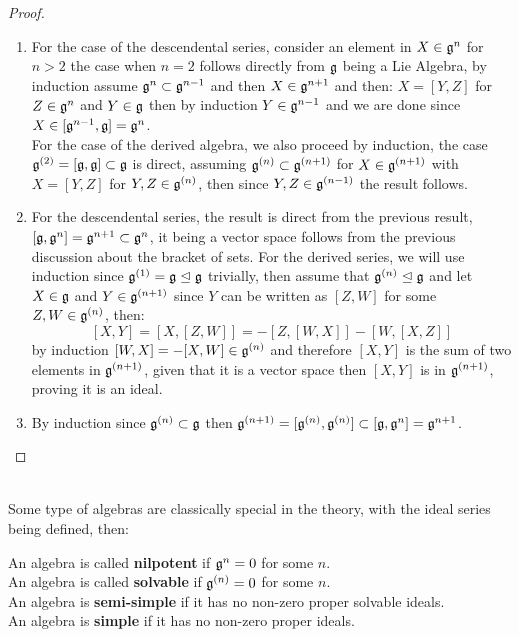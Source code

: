 \begin{proof}
	\begin{enumerate}[label=(\alph*)]
		\item For the case of the descendental series, consider an element in $X \in \mathfrak{g}^n$ for $n > 2$ the case when $n=2$ follows directly from $\mathfrak{g}$ being a Lie Algebra, by induction assume $\mathfrak{g}^{n}\subset \mathfrak{g}^{n-1}$ and then $X \in \mathfrak{g}^{n+1}$ and then: $X=[Y,Z]$ for $Z \in \mathfrak{g}^{n}$ and $Y \in \mathfrak{g}$ then by induction $Y\in \mathfrak{g}^{n-1}$ and we are done since $X \in [\mathfrak{g}^{n-1},\mathfrak{g}] = \mathfrak{g}^{n}$.\\
		For the case of the derived algebra, we also proceed by induction, the case $\mathfrak{g}^{(2)} = [\mathfrak{g},\mathfrak{g}] \subset \mathfrak{g}$ is direct, assuming $\mathfrak{g}^{(n)} \subset \mathfrak{g}^{(n+1)}$ for $X \in \mathfrak{g}^{(n+1)}$ with $X=[Y,Z]$ for $Y,Z \in \mathfrak{g}^{(n)}$, then since $Y,Z \in \mathfrak{g}^{(n-1)}$ the result follows.\\
	\item For the descendental series, the result is direct from the previous result, $[\mathfrak{g},\mathfrak{g}^n] = \mathfrak{g}^{n+1} \subset \mathfrak{g}^n$, it being a vector space follows from the previous discussion about the bracket of sets. For the derived series, we will use induction since $\mathfrak{g}^{(1)}=\mathfrak{g} \trianglelefteq \mathfrak{g}$ trivially, then assume that $\mathfrak{g}^{(n)} \trianglelefteq \mathfrak{g}$ and let $X \in \mathfrak{g}$ and $Y \in \mathfrak{g}^{(n+1)}$ since $Y$ can be written as $[Z,W]$ for some $Z,W \in \mathfrak{g}^{(n)}$, then:
	$$[X,Y] = [X,[Z,W]] = -[Z,[W,X]]-[W,[X,Z]] $$ 
	by induction $[W,X] = -[X,W] \in \mathfrak{g}^{(n)}$ and therefore $[X,Y]$ is the sum of two elements in $\mathfrak{g}^{(n+1)}$, given that it is a vector space then $[X,Y]$ is in $\mathfrak{g}^{(n+1)}$, proving it is an ideal.
	\item By induction since $\mathfrak{g}^{(n)}\subset \mathfrak{g}$ then $\mathfrak{g}^{(n+1)} = [\mathfrak{g}^{(n)},\mathfrak{g}^{(n)}] \subset [\mathfrak{g},\mathfrak{g}^n] = \mathfrak{g}^{n+1}$.
	\end{enumerate}
\end{proof}\\
Some type of algebras are classically special in the theory, with the ideal series being defined, then:
\begin{defi}

 An algebra is called \textbf{nilpotent} if $\mathfrak{g}^n = 0$ for some $n$.\\
 An algebra is called \textbf{solvable} if $\mathfrak{g}^{(n)}=0$ for some $n$.\\
 An algebra is \textbf{semi-simple} if it has no non-zero proper solvable ideals.\\
 An algebra is \textbf{simple} if it has no non-zero proper ideals.

\label{algebratypes}
\end{defi}
